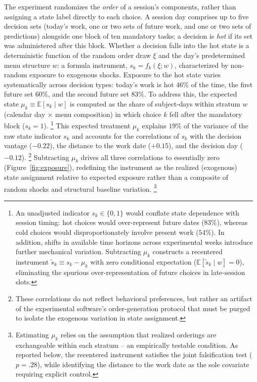 \documentclass[11pt,a4paper]{article}
\theoremstyle{plain}
\theoremstyle{definition}
\begin{document}
The experiment randomizes the \emph{order} of a session's components, rather than assigning a state label directly to each choice. 
A session day comprises up to five decision sets (today's work, one or two sets of future work, and one or two sets of predictions) alongside one block of ten mandatory tasks; a decision is \textit{hot} if its set was administered after this block. Whether a decision falls into the hot state is a deterministic function of the random order draw $\xi$ and the day's predetermined menu structure $w$: a formula instrument, $s_k=f_k(\xi;w)$, characterized by non-random exposure to exogenous shocks. %
Exposure to the hot state varies systematically across decision types: today's work is hot $46\%$ of the time, the first future set $60\%$, and the second future set $83\%$. To address this, the expected state $\mu_k \equiv \mathbb{E}[s_k \mid w]$ is computed as the share of subject-days within stratum $w$ (calendar day $\times$ menu composition) in which choice $k$ fell after the mandatory block ($s_k=1$).%
\footnote{%
An unadjusted indicator $s_k \in \{0, 1\}$ would conflate state dependence with session timing: hot choices would over-represent future dates ($83\%$), whereas cold choices would disproportionately involve present work ($54\%$). In addition, shifts in available time horizons across experimental weeks introduce further mechanical variation. Subtracting $\mu_k$ constructs a recentered instrument $\tilde{s}_k \equiv s_k - \mu_k$ with zero conditional expectation ($\mathbb{E}[\tilde{s}_k \mid w] = 0$), eliminating the spurious over-representation of future choices in late-session slots.} 
This expected treatment $\mu_k$ explains $19\%$ of the variance of the raw state indicator $s_k$ and accounts for the correlations of $s_k$ with the decision vantage ($-0.22$), the distance to the work date ($+0.15$), and the %
decision day ($-0.12$).%
\footnote{%
These correlations do not reflect behavioral preferences, but rather an artifact of the experimental software's order-generation protocol that must be purged to isolate the exogenous variation in state assignment.} 
Subtracting $\mu_k$ drives all three correlations to essentially zero (Figure~\ref{fig:exposure}), redefining the instrument as the realized (exogenous) state assignment relative to expected exposure rather than a composite of random shocks and structural baseline variation.%
\footnote{%
Estimating $\mu_k$ relies on the assumption that realized orderings are exchangeable within each stratum -- an empirically testable condition. As reported below, the recentered instrument satisfies the joint falsification test ($p = .28$), while identifying the distance to the work date as the sole covariate requiring explicit control.}
\end{document}
